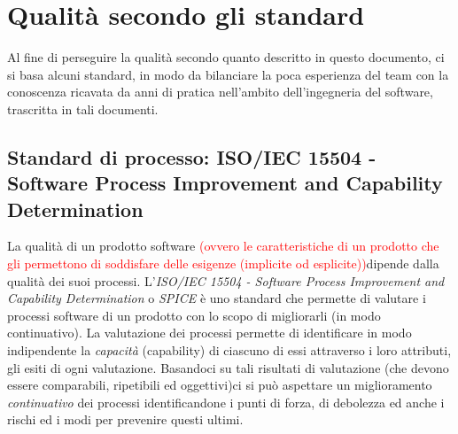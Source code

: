 \section{Qualità secondo gli standard}
Al fine di perseguire la qualità secondo quanto descritto in questo documento, ci si basa alcuni standard, in modo da bilanciare la poca esperienza del team con la conoscenza ricavata da anni di pratica nell'ambito dell'ingegneria del software, trascritta in tali documenti.
\subsection{Standard di processo: ISO/IEC 15504 - Software Process Improvement and Capability Determination}
\label{AppA:standardProc}
La qualità di un prodotto software   \textcolor{red}{(ovvero le caratteristiche di un prodotto che gli permettono di soddisfare delle esigenze (implicite od esplicite))}dipende dalla qualità dei suoi processi.
L'\emph{ISO/IEC 15504 - Software Process Improvement and Capability Determination} o \emph{SPICE} è uno standard che permette di valutare i processi software di un prodotto con lo scopo di migliorarli  (in modo continuativo). La valutazione dei processi permette di identificare in modo indipendente la \emph{capacità} (capability) di ciascuno di essi attraverso i loro attributi, gli esiti di ogni valutazione. Basandoci su tali risultati di valutazione (che devono essere comparabili, ripetibili ed oggettivi)ci si può aspettare un miglioramento \emph{continuativo} dei processi identificandone i punti di forza, di debolezza ed anche i rischi ed i modi per prevenire questi ultimi.

